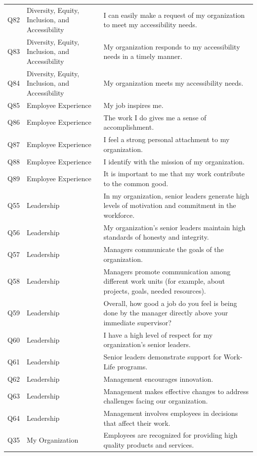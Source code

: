\documentclass[
  man]{apa7}
\newenvironment{lltable}{\begin{landscape}\centering\begin{ThreePartTable}}{\end{ThreePartTable}\end{landscape}}
\begin{document}
\begin{lltable}
{\begin{longtable}{lll}
Q82 & Diversity, Equity, Inclusion, and Accessibility & I can easily make a request of my organization to meet my accessibility needs.\\
Q83 & Diversity, Equity, Inclusion, and Accessibility & My organization responds to my accessibility needs in a timely manner.\\
Q84 & Diversity, Equity, Inclusion, and Accessibility & My organization meets my accessibility needs.\\
Q85 & Employee Experience & My job inspires me.\\
Q86 & Employee Experience & The work I do gives me a sense of accomplishment.\\
Q87 & Employee Experience & I feel a strong personal attachment to my organization.\\
Q88 & Employee Experience & I identify with the mission of my organization.\\
Q89 & Employee Experience & It is important to me that my work contribute to the common good.\\
Q55 & Leadership & In my organization, senior leaders generate high levels of motivation and commitment in the workforce.\\
Q56 & Leadership & My organization's senior leaders maintain high standards of honesty and integrity.\\
Q57 & Leadership & Managers communicate the goals of the organization.\\
Q58 & Leadership & Managers promote communication among different work units (for example, about projects, goals, needed resources).\\
Q59 & Leadership & Overall, how good a job do you feel is being done by the manager directly above your immediate supervisor?\\
Q60 & Leadership & I have a high level of respect for my organization's senior leaders.\\
Q61 & Leadership & Senior leaders demonstrate support for Work-Life programs.\\
Q62 & Leadership & Management encourages innovation.\\
Q63 & Leadership & Management makes effective changes to address challenges facing our organization.\\
Q64 & Leadership & Management involves employees in decisions that affect their work.\\
Q35 & My Organization & Employees are recognized for providing high quality products and services.\\

\end{longtable}}
\end{lltable}
\end{document}
